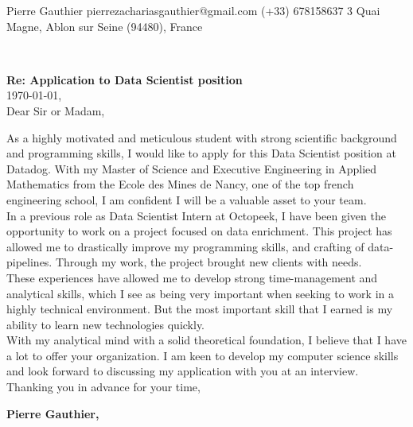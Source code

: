 \documentclass{cv_style}
\begin{document}
    {Pierre Gauthier}
    {{pierrezachariasgauthier@gmail.com}}
    {{(+33) 678158637}}
    {3 Quai Magne, Ablon sur Seine  (94480), France}

\vspace{3cm}\\
\begin{flushleft}
    \large
    \textbf{Re: Application to Data Scientist position}\\[0.2cm]
    \today, \\[1cm]
    Dear Sir or Madam,
\end{flushleft}
\vspace{0.4cm}
\large
As a highly motivated and meticulous student with strong scientific background
and programming skills, I would like to apply for this Data Scientist position at Datadog.
With my Master of Science and Executive Engineering in Applied Mathematics
from the Ecole des Mines de Nancy, one of the top french engineering school,
I am confident I will be a valuable asset to your team. 
\\[0.5cm]
In a previous role as Data Scientist Intern at Octopeek, I have been given the opportunity to work on a project focused on data enrichment. This project has allowed me to drastically improve my programming skills, and crafting of data-pipelines. Through my work, the project brought new clients with needs.  
\\[0.5cm]
These experiences have allowed me to develop strong time-management and
analytical skills, which I see as being very important when seeking to work
in a highly technical environment. But the most important skill that I earned
is my ability to learn new technologies quickly. 
\\[0.5cm]
With my analytical mind with a solid theoretical foundation, I believe that I have a lot to offer your organization. I am keen to develop my computer science skills and look forward to discussing my application with you at an interview. 
\\[0.5cm]
Thanking you in advance for your time, 
\\[0.5cm]






\begin{flushright}
\parbox{5cm}{
\centering
    \textbf{Pierre Gauthier,}\\
}
\end{flushright}
\end{document}
